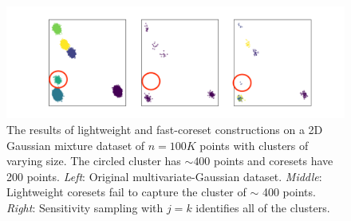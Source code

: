 \begin{figure}
\centering
\hspace*{-0.1cm}
\includegraphics[trim={4cm 0 0 0},clip,width=1.13\linewidth]{images/lightweight_breaks.png}
\vspace*{-0.8cm}
\caption{
The results of lightweight and fast-coreset constructions on a 2D Gaussian mixture dataset of $n=100K$ points with clusters of varying size. The circled cluster has $\sim 400$
points and coresets have 200 points.
\emph{Left}: Original multivariate-Gaussian dataset.
\emph{Middle}: Lightweight coresets fail to capture the cluster of $\sim$ 400 points.
\emph{Right}: Sensitivity sampling with $j=k$ identifies all of the clusters.
}
\label{fig:lightweight_breaks}
\end{figure}
